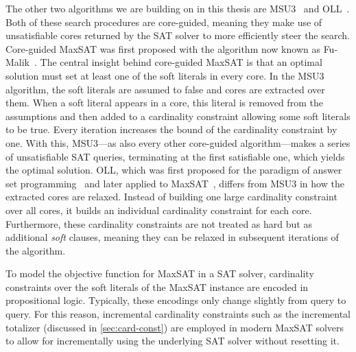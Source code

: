 The other two algorithms we are building on in this thesis are MSU3~\autocite{DBLP:journals/corr/abs-0712-1097} and OLL~\autocite{DBLP:conf/cp/MorgadoDM14,DBLP:journals/jsat/IgnatievMM19}.
Both of these search procedures are core-guided, meaning they make use of unsatisfiable cores returned by the SAT solver to more efficiently steer the search.
Core-guided MaxSAT was first proposed with the algorithm now known as Fu-Malik~\autocite{DBLP:conf/sat/FuM06}.
The central insight behind core-guided MaxSAT is that an optimal solution must set at least one of the soft literals in every core.
In the MSU3 algorithm, the soft literals are assumed to false and cores are extracted over them.
When a soft literal appears in a core, this literal is removed from the assumptions and then added to a cardinality constraint allowing some soft literals to be true.
Every iteration increases the bound of the cardinality constraint by one.
With this, MSU3---as also every other core-guided algorithm---makes a series of unsatisfiable SAT queries, terminating at the first satisfiable one, which yields the optimal solution.
OLL, which was first proposed for the paradigm of answer set programming~\autocite{DBLP:conf/iclp/AndresKMS12} and later applied to MaxSAT~\autocite{DBLP:conf/cp/MorgadoDM14,DBLP:journals/jsat/IgnatievMM19}, differs from MSU3 in how the extracted cores are relaxed.
Instead of building one large cardinality constraint over all cores, it builds an individual cardinality constraint for each core.
Furthermore, these cardinality constraints are not treated as hard but as additional \emph{soft} clauses, meaning they can be relaxed in subsequent iterations of the algorithm.

To model the objective function for MaxSAT in a SAT solver, cardinality constraints over the soft literals of the MaxSAT instance are encoded in propositional logic.
Typically, these encodings only change slightly from query to query.
For this reason, incremental cardinality constraints such as the incremental totalizer (discussed in \cref{sec:card-const}) are employed in modern MaxSAT solvers to allow for incrementally using the underlying SAT solver without resetting it.